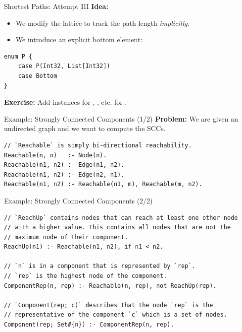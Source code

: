 \begin{frame}[fragile]{Shortest Paths: Attempt III}
\textbf{Idea:}

\begin{itemize}
    \item We modify the lattice to track the path length \emph{implicitly}.
    \item We introduce an explicit bottom element: 
\end{itemize}

\begin{lstlisting}[language=flix, xleftmargin=0.8cm]
enum P {
    case P(Int32, List[Int32])
    case Bottom
}
\end{lstlisting}

\pause 

\textbf{Exercise:} Add instances for , , etc. for .
\end{frame}

\begin{frame}[fragile]{Example: Strongly Connected Components (1/2)}
\textbf{Problem:} We are given an undirected graph and we want to compute the SCCs.
\medskip
\begin{lstlisting}[language=flix, xleftmargin=0.8cm]
// `Reachable` is simply bi-directional reachability.
Reachable(n, n)   :- Node(n).
Reachable(n1, n2) :- Edge(n1, n2).
Reachable(n1, n2) :- Edge(n2, n1).
Reachable(n1, n2) :- Reachable(n1, m), Reachable(m, n2).
\end{lstlisting}
\end{frame}

\begin{frame}[fragile]{Example: Strongly Connected Components (2/2)}
\begin{lstlisting}[language=flix, xleftmargin=0.8cm]
// `ReachUp` contains nodes that can reach at least one other node 
// with a higher value. This contains all nodes that are not the 
// maximum node of their component.
ReachUp(n1) :- Reachable(n1, n2), if n1 < n2.

// `n` is in a component that is represented by `rep`.
// `rep` is the highest node of the component.
ComponentRep(n, rep) :- Reachable(n, rep), not ReachUp(rep).

// `Component(rep; c)` describes that the node `rep` is the 
// representative of the component `c` which is a set of nodes. 
Component(rep; Set#{n}) :- ComponentRep(n, rep).
\end{lstlisting}
\end{frame}

